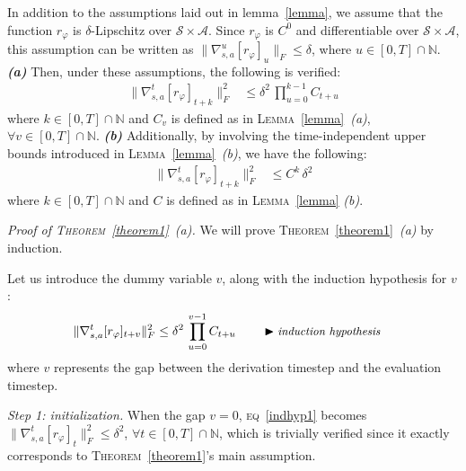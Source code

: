 \begin{theorem}
\label{theorem1}
In addition to the assumptions laid out in lemma~\ref{lemma},
we assume that the function $r_\varphi$ is $\delta$-Lipschitz
over $\mathcal{S} \times \mathcal{A}$.
Since $r_\varphi$ is $C^0$ and differentiable over $\mathcal{S} \times \mathcal{A}$,
this assumption can be written as
$\lVert \nabla_{s,a}^u[r_\varphi]_u \rVert _F \leq \delta$,
where $u \in [0, T] \cap \mathbb{N}$.
\textbf{\emph{(a)}} Then, under these assumptions, the following is verified:
\begin{align}
\lVert \nabla_{s,a}^t[r_\varphi]_{t+k} \rVert ^2_F
&\leq
\delta ^2 \, \prod_{u=0}^{k-1} C_{t+u}
\end{align}
where $k \in [0, T] \cap \mathbb{N}$ and $C_v$ is defined as
in \textsc{Lemma}~\ref{lemma}~\textit{(a)}, $\forall v \in [0, T] \cap \mathbb{N}$.
\textbf{\emph{(b)}} Additionally, by involving the time-independent upper bounds
introduced in \textsc{Lemma}~\ref{lemma}~\textit{(b)}, we have the following:
\begin{align}
\lVert \nabla_{s,a}^t[r_\varphi]_{t+k} \rVert ^2_F
&\leq
C^k \, \delta ^2
\end{align}
where $k \in [0, T] \cap \mathbb{N}$ and $C$ is defined as
in \textsc{Lemma}~\ref{lemma} \textit{(b)}.
\end{theorem}

\emph{Proof of \textsc{Theorem}~\ref{theorem1}~\emph{(a)}.}
We will prove \textsc{Theorem}~\ref{theorem1}~\emph{(a)} by induction.

Let us introduce the dummy variable $v$,
along with the induction hypothesis for $v$:
\begin{align}
\lVert \nabla_{s,a}^t[r_\varphi]_{t+v} \rVert ^2_F
&\leq
\delta ^2 \, \prod_{u=0}^{v-1} C_{t+u}
\qquad
\blacktriangleright\text{\small{\textit{induction hypothesis}}}
\label{indhyp1}
\end{align}
where $v$ represents the gap between the derivation timestep and the evaluation timestep.

\emph{Step 1: initialization.} When the gap $v=0$, \textsc{eq}~\ref{indhyp1} becomes
$\lVert \nabla_{s,a}^t[r_\varphi]_t \rVert ^2_F \leq \delta ^2$,
$\forall t \in [0, T] \cap \mathbb{N}$,
which is trivially verified since it exactly corresponds to \textsc{Theorem}~\ref{theorem1}'s
main assumption.

